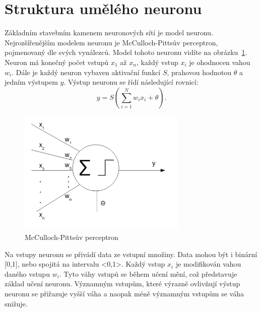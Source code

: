 \documentclass[11pt,twoside,a4paper]{book}
\begin{document}
\section{Struktura umělého neuronu}
Základním stavebním kamenem neuronových sítí je model neuronu. Nejrozšířenějším modelem neuronu je McCulloch-Pittsův perceptron, pojmenovaný dle svých vynálezců.  Model tohoto neuronu vidíte na obrázku~\ref{fig:perceptron}. Neuron má konečný počet vstupů \begin{math} x_{1}\end{math} až \begin{math}x_{n}\end{math}, každý vstup \begin{math} x_{i}\end{math} je ohodnocen vahou \begin{math} w_{i}\end{math}. Dále je každý neuron vybaven aktivační funkcí \begin{math}S\end{math}, prahovou hodnotou \begin{math}\theta\end{math} a jedním výstupem \begin{math} y\end{math}. Výstup neuronu se řídí následující rovnicí:
\begin{equation}
  y=S(\sum\limits_{i=1}^N w_{i}x_{i} + \theta)\mbox{.}
\end{equation}

\begin{figure}[!h]
\begin{center}
\includegraphics[height=6cm]{figures/perceptron.png}
\caption{McCulloch-Pittsův perceptron}
\label{fig:perceptron}
\end{center}
\end{figure}

Na vstupy neuronu se přivádí data ze vstupní množiny. Data mohou být i binární [0,1], nebo spojitá na intervalu <0,1>. Každý vstup \begin{math} x_{i}\end{math} je modifikován vahou daného vstupu \begin{math} w_{i}\end{math}. Tyto váhy vstupů se během učení mění, což představuje základ učení neuronu. Významným vstupům, které výrazně ovlivňují výstup neuronu se přiřazuje vyšší váha a naopak méně významným vstupům se váha snižuje.
\end{document}
